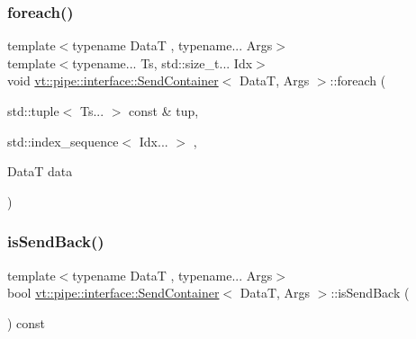 \mbox{\label{structvt_1_1pipe_1_1interface_1_1_send_container_ac3c7c21335376c4d20eee85de5f44885}} 
\subsubsection{\texorpdfstring{foreach()}{foreach()}\hspace{0.1cm}{\footnotesize\ttfamily [2/2]}}
{\footnotesize\ttfamily template$<$typename DataT , typename... Args$>$ \\
template$<$typename... Ts, std\+::size\+\_\+t... Idx$>$ \\
void \hyperlink{structvt_1_1pipe_1_1interface_1_1_send_container}{vt\+::pipe\+::interface\+::\+Send\+Container}$<$ DataT, Args $>$\+::foreach (\begin{DoxyParamCaption}\item[{std\+::tuple$<$ Ts... $>$ const \&}]{tup,  }\item[{std\+::index\+\_\+sequence$<$ Idx... $>$}]{,  }\item[{DataT}]{data }\end{DoxyParamCaption})\hspace{0.3cm}{\ttfamily [private]}}

\mbox{\label{structvt_1_1pipe_1_1interface_1_1_send_container_a10bb4ccfed5beef53a7e289d094cfed2}} 
\subsubsection{\texorpdfstring{is\+Send\+Back()}{isSendBack()}}
{\footnotesize\ttfamily template$<$typename DataT , typename... Args$>$ \\
bool \hyperlink{structvt_1_1pipe_1_1interface_1_1_send_container}{vt\+::pipe\+::interface\+::\+Send\+Container}$<$ DataT, Args $>$\+::is\+Send\+Back (\begin{DoxyParamCaption}{ }\end{DoxyParamCaption}) const\hspace{0.3cm}{\ttfamily [private]}}

